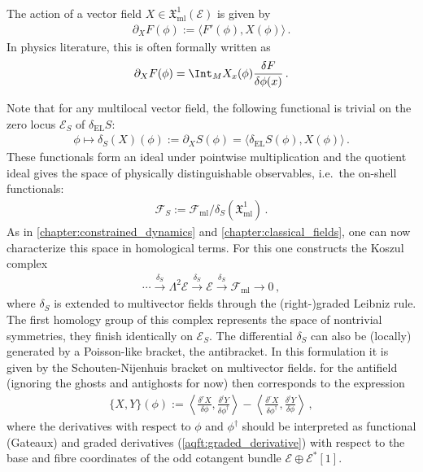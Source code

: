     The action of a vector field $X\in\mathfrak{X}^1_{\text{ml}}(\mathcal{E})$ is given by
    \begin{gather}
        \partial_XF(\phi) := \langle F'(\phi),X(\phi) \rangle\,.
    \end{gather}
    In physics literature, this is often formally written as
    \begin{gather}
        \partial_XF(\phi) = \Int_MX_x(\phi)\frac{\delta F}{\delta\phi(x)}\,.
    \end{gather}

    Note that for any multilocal vector field, the following functional is trivial on the zero locus $\mathcal{E}_S$ of $\delta_{\text{EL}}S$:
    \begin{gather}
        \phi\mapsto\delta_S(X)(\phi):=\partial_XS(\phi)=\langle\delta_{\text{EL}}S(\phi),X(\phi)\rangle\,.
    \end{gather}
    These functionals form an ideal under pointwise multiplication and the quotient ideal gives the space of physically distinguishable observables, i.e.~the on-shell functionals:
    \begin{gather}
        \mathcal{F}_S := \mathcal{F}_{\text{ml}}/\delta_S(\mathfrak{X}^1_{\text{ml}})\,.
    \end{gather}
    As in \cref{chapter:constrained_dynamics} and \cref{chapter:classical_fields}, one can now characterize this space in homological terms. For this one constructs the Koszul complex
    \begin{gather}
        \cdots\overset{\delta_S}{\longrightarrow}\Lambda^2\mathcal{E}\overset{\delta_S}{\longrightarrow}\mathcal{E}\overset{\delta_S}{\longrightarrow}\mathcal{F}_{\text{ml}}\longrightarrow0\,,
    \end{gather}
    where $\delta_S$ is extended to multivector fields through the (right-)graded Leibniz rule. The first homology group of this complex represents the space of nontrivial symmetries, they finish identically on $\mathcal{E}_S$. The differential $\delta_S$ can also be (locally) generated by a Poisson-like bracket, the antibracket. In this formulation it is given by the Schouten-Nijenhuis bracket on multivector fields.  for the antifield (ignoring the ghosts and antighosts for now) then corresponds to the expression
    \begin{gather}
        \{X,Y\}(\phi) := \left\langle\frac{\delta^rX}{\delta\phi},\frac{\delta^lY}{\delta\phi^\dagger}\right\rangle - \left\langle\frac{\delta^rX}{\delta\phi^\dagger},\frac{\delta^lY}{\delta\phi}\right\rangle\,,
    \end{gather}
    where the derivatives with respect to $\phi$ and $\phi^\dagger$ should be interpreted as functional (Gateaux) and graded derivatives (\cref{aqft:graded_derivative}) with respect to the base and fibre coordinates of the odd cotangent bundle $\mathcal{E}\oplus\mathcal{E}^*[1]$.

